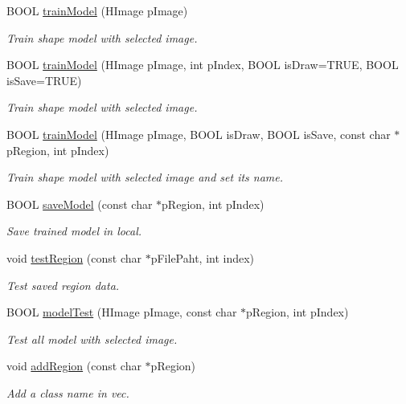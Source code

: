 \begin{DoxyCompactItemize}
B\+O\+OL \hyperlink{class_halcon_lib_a0af40bc307d6a45621df4002f5535ad7}{train\+Model} (H\+Image p\+Image)
\begin{DoxyCompactList}\small\item\em Train shape model with selected image. \end{DoxyCompactList}\item 
B\+O\+OL \hyperlink{class_halcon_lib_a2cf6456936f0eb65aae80ad118bf8dda}{train\+Model} (H\+Image p\+Image, int p\+Index, B\+O\+OL is\+Draw=T\+R\+UE, B\+O\+OL is\+Save=T\+R\+UE)
\begin{DoxyCompactList}\small\item\em Train shape model with selected image. \end{DoxyCompactList}\item 
B\+O\+OL \hyperlink{class_halcon_lib_a1f9d94d6cf0335fc0764ed71a8822f11}{train\+Model} (H\+Image p\+Image, B\+O\+OL is\+Draw, B\+O\+OL is\+Save, const char $\ast$p\+Region, int p\+Index)
\begin{DoxyCompactList}\small\item\em Train shape model with selected image and set its name. \end{DoxyCompactList}\item 
B\+O\+OL \hyperlink{class_halcon_lib_a2b4bc13a1bd54a16b96c1402be4d69e6}{save\+Model} (const char $\ast$p\+Region, int p\+Index)
\begin{DoxyCompactList}\small\item\em Save trained model in local. \end{DoxyCompactList}\item 
void \hyperlink{class_halcon_lib_aa40ae11a5d4fbd0e81e40513ed634bf8}{test\+Region} (const char $\ast$p\+File\+Paht, int index)
\begin{DoxyCompactList}\small\item\em Test saved region data. \end{DoxyCompactList}\item 
B\+O\+OL \hyperlink{class_halcon_lib_a3f25a17ca0d2ed5e5da4c4e2dea72b16}{model\+Test} (H\+Image p\+Image, const char $\ast$p\+Region, int p\+Index)
\begin{DoxyCompactList}\small\item\em Test all model with selected image. \end{DoxyCompactList}\item 
void \hyperlink{class_halcon_lib_a8318bfa1879ededf76f0d1ab4c0b95fd}{add\+Region} (const char $\ast$p\+Region)
\begin{DoxyCompactList}\small\item\em Add a class name in vec. \end{DoxyCompactList}\item 

\end{DoxyCompactItemize}
